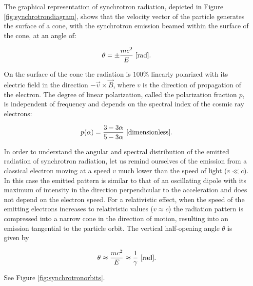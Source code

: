 \documentclass[a4paper,10pt]{article}
\begin{document}
The graphical representation of synchrotron radiation, depicted in Figure \ref{fig:synchrotrondiagram}, shows that the velocity vector of the particle generates the surface of a cone, with the synchrotron emission beamed within the surface of the cone, at an angle of:

\begin{align*}
    \theta = \pm \frac{mc^2}{E} ~ [{\rm rad}].
\end{align*}

{\noindent}On the surface of the cone the radiation is $100\%$ linearly polarized with its electric field in the direction $-\vec{v}\times\vec{B}$, where $v$ is the direction of propagation of the electron. The degree of linear polarization, called the polarization fraction $p$, is independent of frequency and depends on the spectral index of the cosmic ray electrons:

\begin{align*}
    p(\alpha) = \frac{3-3\alpha}{5-3\alpha} ~ [{\rm dimensionless}].
\end{align*}

{\noindent}In order to understand the angular and spectral distribution of the emitted radiation of synchrotron radiation, let us remind ourselves of the emission from a classical electron moving at a speed $v$ much lower than the speed of light ($v\ll c$). In this case the emitted pattern is similar to that of an oscillating dipole with its maximum of intensity in the direction perpendicular to the acceleration and does not depend on the electron speed. For a relativistic effect, when the speed of the emitting electrons increases to relativistic values ($v\approx c$) the radiation pattern is compressed into a narrow cone in the direction of motion, resulting into an emission tangential to the particle orbit. The vertical half-opening angle $\theta$ is given by

\begin{align*}
    \theta \approx \frac{mc^2}{E} \approx \frac{1}{\gamma} ~ [{\rm rad}].
\end{align*}

{\noindent}See Figure \ref{fig:synchrotronorbits}.
\end{document}
